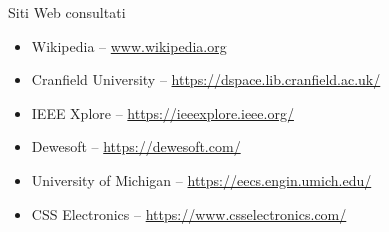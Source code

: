 \cleardoublepage
{}
{}
\nocite{*}


%

\vspace{2.5cm}
\begin{Large}Siti Web consultati\end{Large}
\begin{itemize}
    \item Wikipedia -- \url{www.wikipedia.org}
    \item Cranfield University -- \url{https://dspace.lib.cranfield.ac.uk/}
    \item IEEE Xplore -- \url{https://ieeexplore.ieee.org/}
    \item Dewesoft -- \url{https://dewesoft.com/}
    \item University of Michigan -- \url{https://eecs.engin.umich.edu/}
    \item CSS Electronics -- \url{https://www.csselectronics.com/}
\end{itemize}

